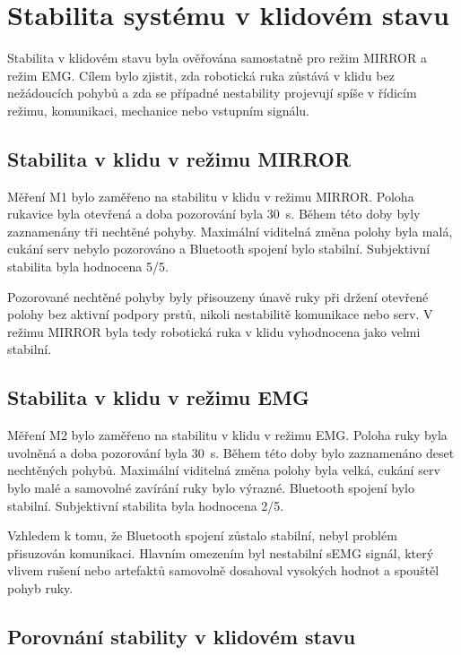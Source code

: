\documentclass[FZS,DP]{tulthesis}
\begin{document}
\section{Stabilita systému v klidovém stavu}
\label{sec:stabilita-klid}

Stabilita v klidovém stavu byla ověřována samostatně pro režim MIRROR a režim EMG\@. Cílem bylo zjistit, zda robotická ruka zůstává v klidu bez nežádoucích pohybů a zda se případné nestability projevují spíše v řídicím režimu, komunikaci, mechanice nebo vstupním signálu.

\subsection{Stabilita v klidu v režimu MIRROR}
\label{subsec:klid-mirror}

Měření M1 bylo zaměřeno na stabilitu v klidu v režimu MIRROR\@. Poloha rukavice byla otevřená a doba pozorování byla 30~s. Během této doby byly zaznamenány tři nechtěné pohyby. Maximální viditelná změna polohy byla malá, cukání serv nebylo pozorováno a Bluetooth spojení bylo stabilní. Subjektivní stabilita byla hodnocena 5/5.

Pozorované nechtěné pohyby byly přisouzeny únavě ruky při držení otevřené polohy bez aktivní podpory prstů, nikoli nestabilitě komunikace nebo serv. V režimu MIRROR byla tedy robotická ruka v klidu vyhodnocena jako velmi stabilní.

\subsection{Stabilita v klidu v režimu EMG}
\label{subsec:klid-emg}

Měření M2 bylo zaměřeno na stabilitu v klidu v režimu EMG\@. Poloha ruky byla uvolněná a doba pozorování byla 30~s. Během této doby bylo zaznamenáno deset nechtěných pohybů. Maximální viditelná změna polohy byla velká, cukání serv bylo malé a samovolné zavírání ruky bylo výrazné. Bluetooth spojení bylo stabilní. Subjektivní stabilita byla hodnocena 2/5.

Vzhledem k tomu, že Bluetooth spojení zůstalo stabilní, nebyl problém přisuzován komunikaci. Hlavním omezením byl nestabilní sEMG signál, který vlivem rušení nebo artefaktů samovolně dosahoval vysokých hodnot a spouštěl pohyb ruky.

\subsection{Porovnání stability v klidovém stavu}
\label{subsec:klid-porovnani}
\end{document}

